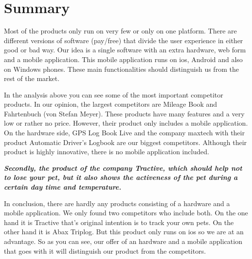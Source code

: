 \section{Summary}
Most of the products only run on very few or only on one platform. There are different versions of software (pay/free)  that divide the user experience in either good or bad way. Our idea is a single software with an extra hardware, web form and a mobile application. This mobile application runs on \gls{ios}, Android and also on Windows phones. These main functionalities should distinguish us from the rest of the market. 

In the analysis above you can see some of the most important competitor products. In our opinion, the largest competitors are Mileage Book and Fahrtenbuch (von Stefan Meyer). These products have many features and a very low or rather no price. However, their product only includes a mobile application.
On the hardware side, GPS Log Book Live and the company maxtech with their product Automatic Driver’s Logbook are our biggest competitors. Although their product is highly innovative, there is no mobile application included. 
\newline \newline

\textit{\textbf{Secondly, the product of the company Tractive, which should help not to lose your pet, but it also shows the activeness of the pet during a certain day time and temperature.}}
\newline \newline

In conclusion, there are hardly any products consisting of a hardware and a mobile application. We only found two competitors who include both. On the one hand it is Tractive that's original intention is to track your own pets. On the other hand it is Abax Triplog. But this product only runs on \gls{ios} so we are at an advantage. So as you can see, our offer of an hardware and a mobile application that goes with it will distinguish our product from the competitors.
\newline\newline


